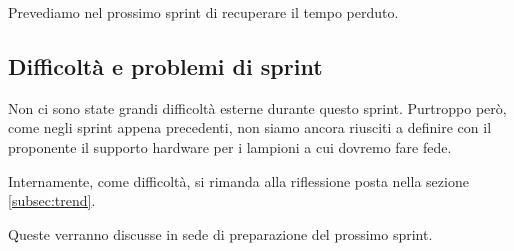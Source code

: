 Prevediamo nel prossimo sprint di recuperare il tempo perduto.

\subsection{Difficoltà e problemi di sprint}

Non ci sono state grandi difficoltà esterne durante questo sprint. Purtroppo però, come negli sprint appena precedenti, non siamo ancora riusciti a definire con il proponente il supporto hardware per i lampioni a cui dovremo fare fede.

Internamente, come difficoltà, si rimanda alla riflessione posta nella sezione \ref{subsec:trend}.

Queste verranno discusse in sede di preparazione del prossimo sprint.
